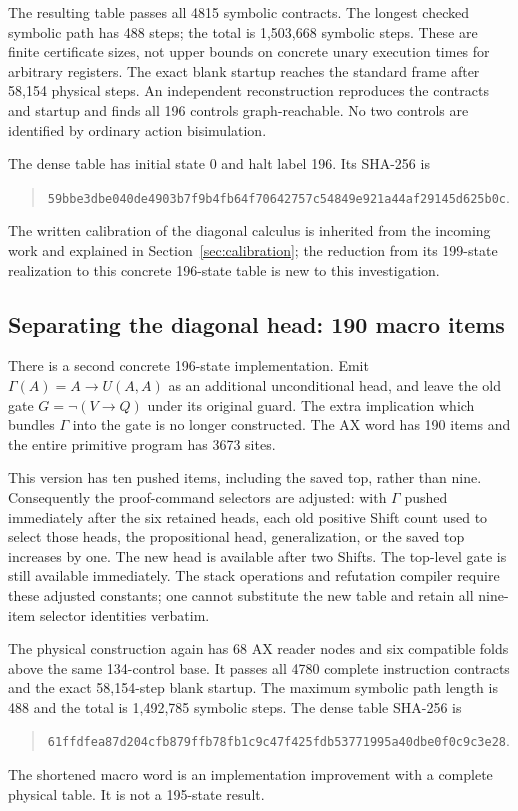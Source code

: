 The resulting table passes all 4815 symbolic contracts. The longest checked symbolic path has 488 steps; the total is 1,503,668 symbolic steps. These are finite certificate sizes, not upper bounds on concrete unary execution times for arbitrary registers. The exact blank startup reaches the standard frame after 58,154 physical steps. An independent reconstruction reproduces the contracts and startup and finds all 196 controls graph-reachable. No two controls are identified by ordinary action bisimulation.

\begin{samepage}
The dense table has initial state 0 and halt label 196. Its SHA-256 is
\begin{quote}\small\nolinkurl{59bbe3dbe040de4903b7f9b4fb64f70642757c54849e921a44af29145d625b0c}.\end{quote}
\end{samepage}
The written calibration of the diagonal calculus is inherited from the incoming work and explained in Section~\ref{sec:calibration}; the reduction from its 199-state realization to this concrete 196-state table is new to this investigation.

\subsection{Separating the diagonal head: 190 macro items}
There is a second concrete 196-state implementation. Emit $\Gamma(A)=A\to U(A,A)$ as an additional unconditional head, and leave the old gate $G=\neg(V\to Q)$ under its original guard. The extra implication which bundles $\Gamma$ into the gate is no longer constructed. The AX word has 190 items and the entire primitive program has 3673 sites.

This version has ten pushed items, including the saved top, rather than nine. Consequently the proof-command selectors are adjusted: with $\Gamma$ pushed immediately after the six retained heads, each old positive Shift count used to select those heads, the propositional head, generalization, or the saved top increases by one. The new head is available after two Shifts. The top-level gate is still available immediately. The stack operations and refutation compiler require these adjusted constants; one cannot substitute the new table and retain all nine-item selector identities verbatim.

The physical construction again has 68 AX reader nodes and six compatible folds above the same 134-control base. It passes all 4780 complete instruction contracts and the exact 58,154-step blank startup. The maximum symbolic path length is 488 and the total is 1,492,785 symbolic steps. The dense table SHA-256 is
\begin{quote}\small\nolinkurl{61ffdfea87d204cfb879ffb78fb1c9c47f425fdb53771995a40dbe0f0c9c3e28}.\end{quote}
The shortened macro word is an implementation improvement with a complete physical table. It is not a 195-state result.

